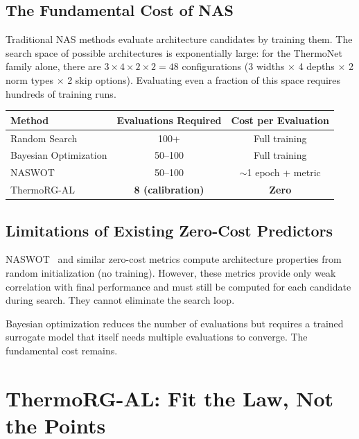 \documentclass[11pt, a4paper]{article}
\theoremstyle{plain}
\begin{document}
\subsection{The Fundamental Cost of NAS}

Traditional NAS methods evaluate architecture candidates by training them. The search space of possible architectures is exponentially large: for the ThermoNet family alone, there are $3 \times 4 \times 2 \times 2 = 48$ configurations (3 widths $\times$ 4 depths $\times$ 2 norm types $\times$ 2 skip options). Evaluating even a fraction of this space requires hundreds of training runs.

\begin{center}
\begin{tabular}{lcc}
\toprule
Method & Evaluations Required & Cost per Evaluation \\
\midrule
Random Search & 100+ & Full training \\
Bayesian Optimization & 50--100 & Full training \\
NASWOT & 50--100 & $\sim$1 epoch + metric \\
ThermoRG-AL & \textbf{8 (calibration)} & \textbf{Zero} \\
\bottomrule
\end{tabular}
\end{center}

\subsection{Limitations of Existing Zero-Cost Predictors}

NASWOT~\citep{abdelfattah2021no} and similar zero-cost metrics compute architecture properties from random initialization (no training). However, these metrics provide only weak correlation with final performance and must still be computed for each candidate during search. They cannot eliminate the search loop.

Bayesian optimization reduces the number of evaluations but requires a trained surrogate model that itself needs multiple evaluations to converge. The fundamental cost remains.

\section{ThermoRG-AL: Fit the Law, Not the Points}
\end{document}
